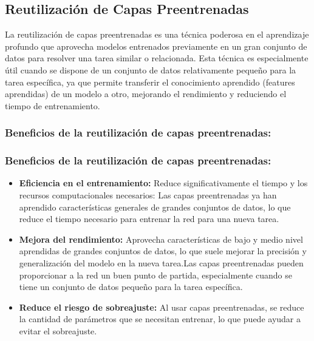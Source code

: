 \documentclass[11pt]{article}
\begin{document}
\subsection{Reutilización de Capas Preentrenadas}
\label{sec:org015d59c}
La reutilización de capas preentrenadas es una técnica poderosa en el
aprendizaje profundo que aprovecha modelos entrenados previamente en un
gran conjunto de datos para resolver una tarea similar o relacionada.
Esta técnica es especialmente útil cuando se dispone de un conjunto de
datos relativamente pequeño para la tarea específica, ya que permite
transferir el conocimiento aprendido (features aprendidas) de un modelo
a otro, mejorando el rendimiento y reduciendo el tiempo de
entrenamiento.

\subsubsection{Beneficios de la reutilización de capas preentrenadas:}
\label{sec:org3ad1b9b}
\subsubsection{Beneficios de la reutilización de capas preentrenadas:}
\label{sec:orgd3b7eff}
\begin{itemize}
\item \textbf{Eficiencia en el entrenamiento:} Reduce significativamente el
tiempo y los recursos computacionales necesarios: Las capas
preentrenadas ya han aprendido características generales de grandes
conjuntos de datos, lo que reduce el tiempo necesario para entrenar
la red para una nueva tarea.
\item \textbf{Mejora del rendimiento:} Aprovecha características de bajo y medio
nivel aprendidas de grandes conjuntos de datos, lo que suele mejorar
la precisión y generalización del modelo en la nueva tarea.Las capas
preentrenadas pueden proporcionar a la red un buen punto de partida,
especialmente cuando se tiene un conjunto de datos pequeño para la
tarea específica.
\item \textbf{Reduce el riesgo de sobreajuste:} Al usar capas preentrenadas, se
reduce la cantidad de parámetros que se necesitan entrenar, lo que
puede ayudar a evitar el sobreajuste.
\end{itemize}
\end{document}
